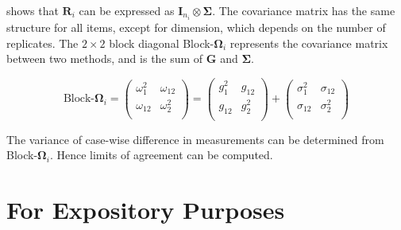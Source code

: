 \documentclass[12pt, a4paper]{report}
\theoremstyle{plain}
\theoremstyle{definition}
\theoremstyle{remark}
\begin{document}
\citet{hamlett} shows that $\boldsymbol{R}_{i}$  can be expressed as $\boldsymbol{I}_{n_{i}} \otimes \boldsymbol{\Sigma}$. The covariance matrix has the same structure for all items, except for dimension, which depends on the number of replicates. The $2 \times 2$ block diagonal Block-$\boldsymbol{\Omega}_{i}$ represents the covariance matrix between two methods, and is the sum of $\boldsymbol{G}$ and $\boldsymbol{\Sigma}$.

\[ \textrm{Block-}\boldsymbol{\Omega}_{i}  = \left(\begin{array}{cc}
\omega^2_1  & \omega_{12} \\
\omega_{12} & \omega^2_2 \\
\end{array}  \right)
=  \left(
\begin{array}{cc}
g^2_1  & g_{12} \\
g_{12} & g^2_2 \\
\end{array} \right)+
\left(
\begin{array}{cc}
\sigma^2_1  & \sigma_{12} \\
\sigma_{12} & \sigma^2_2 \\
\end{array}\right)
\]

The variance of case-wise difference in measurements can be determined from Block-$\boldsymbol{\Omega}_{i}$. Hence limits of agreement can be computed.


\section{For Expository Purposes}
\end{document}
